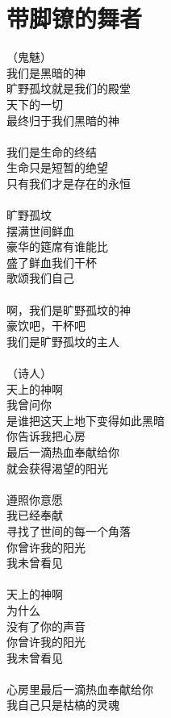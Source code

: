 \chapter{带脚镣的舞者}

\leftskip=25mm
\noindent
（鬼魅）\\
我们是黑暗的神\\
旷野孤坟就是我们的殿堂\\
天下的一切\\
最终归于我们黑暗的神\\
\\
我们是生命的终结\\
生命只是短暂的绝望\\
只有我们才是存在的永恒\\
\\
旷野孤坟\\
摆满世间鲜血\\
豪华的筵席有谁能比\\
盛了鲜血我们干杯\\
歌颂我们自己\\
\\
啊，我们是旷野孤坟的神\\
豪饮吧，干杯吧\\
我们是旷野孤坟的主人\\
\\
（诗人）\\
天上的神啊\\
我曾问你\\
是谁把这天上地下变得如此黑暗\\
你告诉我把心房\\
最后一滴热血奉献给你\\
就会获得渴望的阳光\\
\\
遵照你意愿\\
我已经奉献\\
寻找了世间的每一个角落\\
你曾许我的阳光\\
我未曾看见\\
\\
天上的神啊\\
为什么\\
没有了你的声音\\
你曾许我的阳光\\
我未曾看见\\
\\
心房里最后一滴热血奉献给你\\
我自己只是枯槁的灵魂\\

